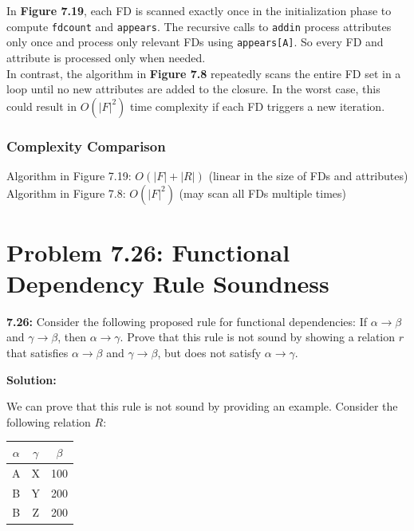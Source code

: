 \documentclass[12pt,a4paper]{article}
\begin{document}
In \textbf{Figure 7.19}, each FD is scanned exactly once in the initialization phase to compute \texttt{fdcount} and \texttt{appears}. The recursive calls to \texttt{addin} process attributes only once and process only relevant FDs using \texttt{appears[A]}. So every FD and attribute is processed only when needed.\\

 In contrast, the algorithm in \textbf{Figure 7.8} repeatedly scans the entire FD set in a loop until no new attributes are added to the closure. In the worst case, this could result in $O(|F|^2)$ time complexity if each FD triggers a new iteration.


\subsubsection*{Complexity Comparison}

{Algorithm in Figure 7.19:} $O(|F| + |R|)$ (linear in the size of FDs and attributes) \\
{Algorithm in Figure 7.8:} $O(|F|^2)$ (may scan all FDs multiple times)


\newpage
\section{Problem 7.26: Functional Dependency Rule Soundness}

\begin{questionbox}
\textbf{7.26:} Consider the following proposed rule for functional dependencies: If $\alpha \rightarrow \beta$ and $\gamma \rightarrow \beta$, then $\alpha \rightarrow \gamma$. Prove that this rule is not sound by showing a relation $r$ that satisfies $\alpha \rightarrow \beta$ and $\gamma \rightarrow \beta$, but does not satisfy $\alpha \rightarrow \gamma$.
\end{questionbox}

\textbf{Solution:}

We can prove that this rule is not sound by providing an example. Consider the following relation $R$:

\begin{center}
\begin{tabular}{|c|c|c|}
\hline
$\alpha$ & $\gamma$ & $\beta$ \\
\hline
A & X & 100 \\
B & Y & 200 \\
B & Z & 200 \\
\hline
\end{tabular}
\end{center}
\end{document}
